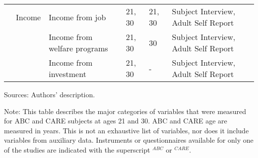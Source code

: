 \begin{sidewaystable}[H]
\begin{threeparttable}
\begin{tabular}{L{3.5cm} C{3.5cm} C{5cm} C{1.5cm} C{1.8cm} C{6cm}}
\\											
	&	Income	&	Income from job	&	21, 30	&	21, 30	&	Subject Interview, Adult Self Report	\\
	&		&	Income from welfare programs	&	21, 30	&	30	&	Subject Interview, Adult Self Report	\\
	&		&	Income from investment	&	21, 30	&	-	&	Subject Interview, Adult Self Report	\\										
 \bottomrule
\end{tabular}										
\begin{tablenotes}									
\scriptsize											
\item Sources: Authors' description. \\				
\item Note: This table describes the major categories of variables that were measured for ABC and CARE subjects at ages 21 and 30. ABC and CARE age are measured in years. This is not an exhaustive list of variables, nor does it include variables from auxiliary data. Instruments or questionnaires available for only one of the studies are indicated with the superscript $^{ABC}$ or $^{CARE}$.			
\end{tablenotes}									
\end{threeparttable}								
\end{sidewaystable}											

